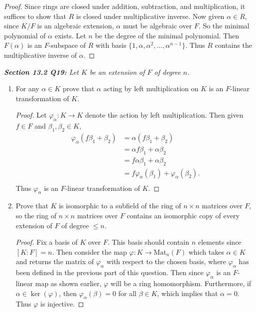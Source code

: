 \documentclass{article}
\begin{document}
  \begin{proof}
    Since rings are closed under addition, subtraction, and multiplication,
    it suffices to show that $R$ is closed under multiplicative inverse.
    Now given $\alpha\in R$, since $K/F$ is an algebraic extension,
    $\alpha$ must be algebraic over $F$. So the minimal polynomial
    of $\alpha$ exists. Let $n$ be the degree of the minimal polynomial.
    Then $F(\alpha)$ is an $F$-subspace of $R$ with basis
    $\{1,\alpha,\alpha^2,\ldots,\alpha^{n-1}\}$. Thus $R$ contains the
    multiplicative inverse of $\alpha$.
  \end{proof}

\it \textbf{Section 13.2 Q19:} Let $K$ be an extension of $F$ of degree
  $n$.

  \begin{enumerate}[label={(\alph*)}]
    \item For any $\alpha\in K$ prove that $\alpha$ acting by left
      multiplication on $K$ is an $F$-linear transformation of $K$.

      \begin{proof}
        Let $\varphi_\alpha:K\rightarrow K$ denote the action by left
        multiplication. Then given $f\in F$ and $\beta_1,\beta_2\in K$,
        \begin{align*}
          \varphi_\alpha(f\beta_1+\beta_2) &=\alpha(f\beta_1+\beta_2)\\
          &=\alpha f\beta_1 +\alpha \beta_2\\
          &=f \alpha \beta_1 +\alpha \beta_2\\
          &=f \varphi_\alpha(\beta_1) +\varphi_\alpha(\beta_2).\\
        \end{align*}
        Thus $\varphi_\alpha$ is an $F$-linear transformation of $K$.
      \end{proof}

    \item Prove that $K$ is isomorphic to a subfield of the ring of
      $n\times n$ matrices over $F$, so the ring of $n\times n$ matrices
      over $F$ contains an isomorphic copy of every extension of $F$ of
      degree $\leq n$.

      \begin{proof}
        Fix a basis of $K$ over $F$. This basis should contain $n$ elements
        since $[K:F]=n$. Then consider the map $\varphi:
        K\rightarrow\text{Mat}_n(F)$ which takes $\alpha\in K$ and returns
        the matrix of $\varphi_\alpha$ with respect to the chosen basis,
        where $\varphi_\alpha$ has been defined in the previous part of
        this question. Then since $\varphi_\alpha$ is an $F$-linear map as
        shown earlier, $\varphi$ will be a ring homomorphism. Furthermore,
        if $\alpha\in\ker(\varphi)$, then $\varphi_\alpha(\beta)=0$ for all
        $\beta\in K$, which implies that $\alpha=0$. Thus $\varphi$ is
        injective.
      \end{proof}
  \end{enumerate}
\end{document}
